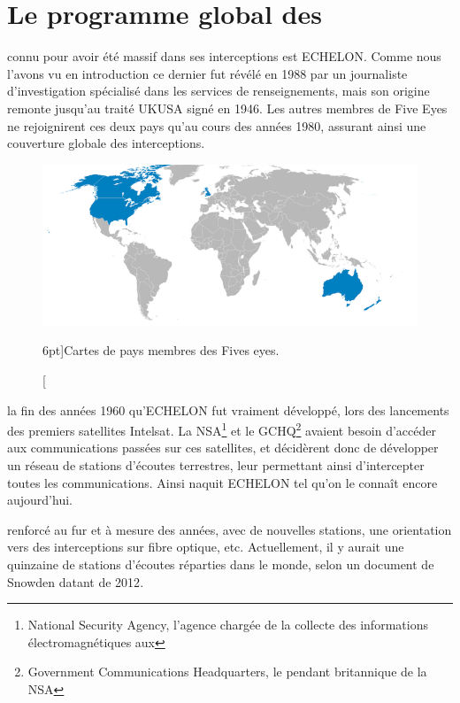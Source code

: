 \newpage
\section{Le programme global des
\EUA}

 connu pour avoir été massif dans ses
interceptions est ECHELON. Comme nous l'avons vu en introduction ce dernier fut
révélé en 1988 par un journaliste d'investigation spécialisé dans les services
de renseignements, mais son origine remonte jusqu'au traité UKUSA signé en 1946.
Les autres membres de Five Eyes ne rejoignirent ces deux pays qu'au cours des
années 1980, assurant ainsi une couverture globale des interceptions.

\begin{figure}
\includegraphics{fiveeyes.png}
\caption[Cartes de pays membres des Five Eyes][6pt]{Cartes de pays membres des
Fives eyes.}
\label{fig:carte}
\end{figure}

 la fin des années 1960\autocite{ZDNET} qu'ECHELON fut
vraiment développé, lors des lancements des premiers satellites Intelsat. La
NSA\footnote{National Security Agency, l'agence chargée de la collecte des
informations électromagnétiques aux \EUA} et le GCHQ\footnote{Government
Communications Headquarters, le pendant britannique de la NSA} avaient besoin
d'accéder aux communications passées sur ces satellites, et décidèrent
donc de développer un réseau de stations d'écoutes terrestres, leur permettant
ainsi d'intercepter toutes les communications. Ainsi naquit ECHELON tel qu'on le
connaît encore aujourd'hui.

 renforcé au fur et à mesure des années, avec de
nouvelles stations, une orientation vers des interceptions sur fibre optique,
etc. Actuellement, il y aurait une quinzaine de stations d'écoutes réparties
dans le monde, selon un document de Snowden datant de 2012\autocite{Stations}.

